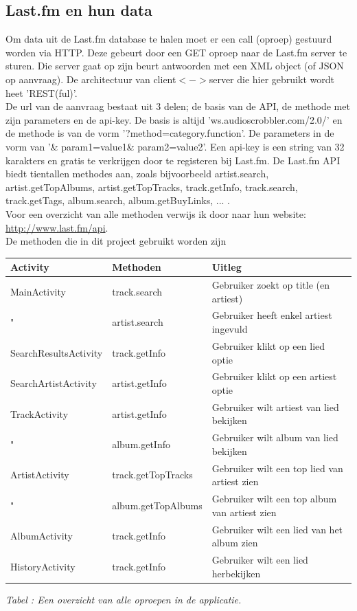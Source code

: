 \documentclass[11pt,a4paper]{article}
\newcounter{tabc}
\newcommand{\tabID} {%
   \stepcounter{tabc}%
   \thetabc}
\begin{document}
		
			\subsection{Last.fm en hun data}
	\label{sec:Tracks omzetten}
	
Om data uit de Last.fm database te halen moet er een call (oproep) gestuurd worden via HTTP. Deze gebeurt door een GET oproep naar de Last.fm server te sturen. Die server gaat op zijn beurt antwoorden met een XML object (of JSON op aanvraag). De architectuur van client$<->$server die hier gebruikt wordt heet 'REST(ful)'. \\

De url van de aanvraag bestaat uit 3 delen; de basis van de API, de methode met zijn parameters en de api-key. De basis is altijd 'ws.audioscrobbler.com/2.0/' en de methode is van de vorm '?method=category.function'. De parameters in de vorm van '\& param1=value1\& param2=value2'. Een api-key is een string van 32 karakters en gratis te verkrijgen door te registeren bij Last.fm.
De Last.fm API biedt tientallen methodes aan, zoals bijvoorbeeld artist.search, artist.getTopAlbums, artist.getTopTracks, track.getInfo, track.search, track.getTags, album.search, album.getBuyLinks, ... . \\
Voor een overzicht van alle methoden verwijs ik door naar hun website: \url{http://www.last.fm/api}. \\ 

De methoden die in dit project gebruikt worden zijn
\begin{tabular}{| l | l | l |}
\hline
	Activity 				&	Methoden			& Uitleg \\ \hline
	MainActivity			&	track.search 		& Gebruiker zoekt op title (en artiest) \\
	"						&	artist.search 		& Gebruiker heeft enkel artiest ingevuld \\ \hline
	SearchResultsActivity	&	track.getInfo		& Gebruiker klikt op een lied optie \\ \hline
	SearchArtistActivity	&	artist.getInfo		& Gebruiker klikt op een artiest optie \\ \hline
	TrackActivity			&	artist.getInfo		& Gebruiker wilt artiest van lied bekijken \\
	"						&	album.getInfo		& Gebruiker wilt album van lied bekijken \\ \hline
	ArtistActivity			&	track.getTopTracks	& Gebruiker wilt een top lied van artiest zien \\
	"						&	album.getTopAlbums	& Gebruiker wilt een top album van artiest zien \\ \hline
	AlbumActivity			&	track.getInfo		& Gebruiker wilt een lied van het album zien \\
	HistoryActivity			&	track.getInfo		& Gebruiker wilt een lied herbekijken \\
\hline
\end{tabular}
	\small \textit{Tabel \tabID : Een overzicht van alle oproepen in de applicatie.} \\ \normalsize
\end{document}
